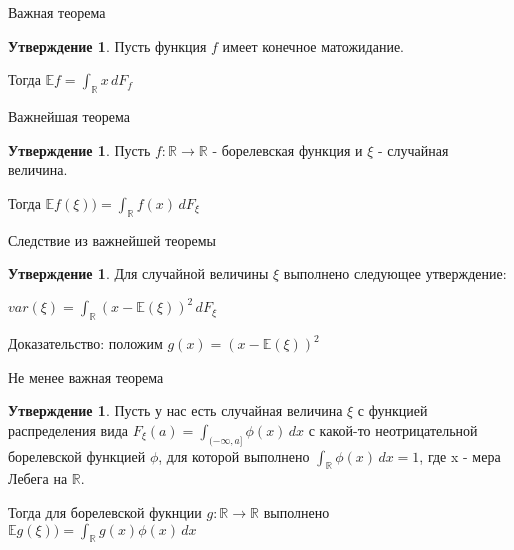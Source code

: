 \documentclass{beamer}%
\theoremstyle{definition}
\newtheorem{proposition}[theorem]{Утверждение}
\begin{document}
\begin{frame}{Важная теорема}
\begin{proposition}
    Пусть функция $f$ имеет конечное матожидание. 
    
    Тогда $\mathbb{E}f = \int_\mathbb{R}x\,dF_f$
\end{proposition}

\end{frame}

\begin{frame}{Важнейшая теорема}



\begin{proposition}
    Пусть $f: \mathbb{R} \rightarrow \mathbb{R}$  - борелевская функция и $\xi$ - случайная величина. 
    
    Тогда $\mathbb{E}f(\xi)) = \int_\mathbb{R}f(x)\,dF_\xi$
\end{proposition}

\end{frame}

\begin{frame}{Следствие из важнейшей теоремы}

\begin{proposition}
    Для случайной величины $\xi$ выполнено следующее утверждение:
    
    $var(\xi) = \int_\mathbb{R}(x-\mathbb{E}(\xi))^2\,dF_\xi$
\end{proposition}
Доказательство: положим $ g(x) =(x-\mathbb{E}(\xi))^2 $

\end{frame}

\begin{frame}{Не менее важная теорема}

\begin{proposition}
    Пусть у нас есть случайная величина $\xi$ с функцией распределения вида $F_\xi(a) = \int_{(-\infty,a]}\phi(x)\,dx$ с какой-то неотрицательной борелевской функцией $\phi$, для которой выполнено $\int_\mathbb{R}\phi(x)\,dx =1$, где x - мера Лебега на $\mathbb{R}$.
    
    Тогда для борелевской фукнции $g:\mathbb{R} \rightarrow \mathbb{R}$ выполнено $\mathbb{E}g(\xi)) = \int_\mathbb{R}g(x)\phi(x)\,dx$
\end{proposition}
\end{frame}
\end{document}

